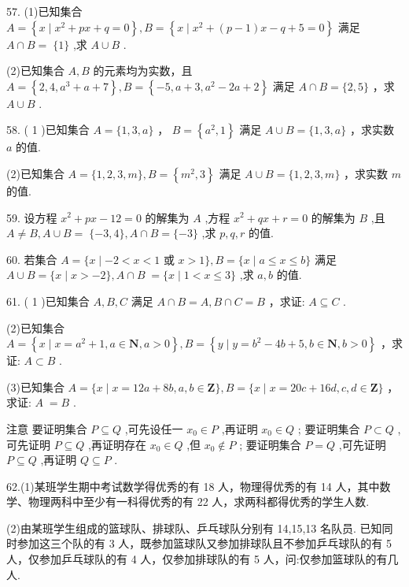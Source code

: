 \documentclass[10pt]{article}
\begin{document}
57. (1)已知集合 \(A = \left\{  {x \mid  {x}^{2} + {px} + q = 0}\right\}  ,B = \left\{  {x \mid  {x}^{2} + \left( {p - 1}\right) x - q + 5 = 0}\right\}\) 满足 \(A \cap  B = \; \{ 1\}\) ,求 \(A \cup  B\) .

(2)已知集合 \(A,B\) 的元素均为实数，且 \(A = \left\{  {2,4,{a}^{3} + a + 7}\right\}  ,B = \left\{  {-5,a + 3,{a}^{2} - {2a} + 2}\right\}\) 满足 \(A \cap  B = \{ 2,5\}\) ，求 \(A \cup  B\) .

58. ( 1 )已知集合 \(A = \{ 1,3,a\}\) ， \(B = \left\{  {{a}^{2},1}\right\}\) 满足 \(A \cup  B = \{ 1,3,a\}\) ，求实数 \(a\) 的值.

(2)已知集合 \(A = \{ 1,2,3,m\} ,B = \left\{  {{m}^{2},3}\right\}\) 满足 \(A \cup  B = \{ 1,2,3,m\}\) ，求实数 \(m\) 的值.

59. 设方程 \({x}^{2} + {px} - {12} = 0\) 的解集为 \(A\) ,方程 \({x}^{2} + {qx} + r = 0\) 的解集为 \(B\) ,且 \(A \neq  B,A \cup  B = \; \{  - 3,4\} ,A \cap  B = \{  - 3\}\) ,求 \(p,q,r\) 的值.

60. 若集合 \(A = \{ x \mid   - 2 < x < 1\) 或 \(x > 1\} ,B = \{ x \mid  a \leq  x \leq  b\}\) 满足 \(A \cup  B = \{ x \mid  x >  - 2\} ,A \cap  B \; = \{ x \mid  1 < x \leq  3\}\) ,求 \(a,b\) 的值.

61. ( 1 )已知集合 \(A,B,C\) 满足 \(A \cap  B = A,B \cap  C = B\) ，求证: \(A \subseteq  C\) .

(2)已知集合 \(A = \left\{  {x \mid  x = {a}^{2} + 1,a \in  \mathbf{N},a > 0}\right\}  ,B = \left\{  {y \mid  y = {b}^{2} - {4b} + 5,b \in  \mathbf{N},b > 0}\right\}\) ，求证: \(A \subset  B\) .

(3)已知集合 \(A = \{ x \mid  x = {12a} + {8b},a,b \in  \mathbf{Z}\} ,B = \{ x \mid  x = {20c} + {16d},c,d \in  \mathbf{Z}\}\) ，求证: \(A \; = B\) .

注意 要证明集合 \(P \subseteq  Q\) ,可先设任一 \({x}_{0} \in  P\) ,再证明 \({x}_{0} \in  Q\) ; 要证明集合 \(P \subset  Q\) ,可先证明 \(P \subseteq  Q\) ,再证明存在 \({x}_{0} \in  Q\) ,但 \({x}_{0} \notin  P\) ; 要证明集合 \(P = Q\) ,可先证明 \(P \subseteq  Q\) ,再证明 \(Q \subseteq  P\) .

62.(1)某班学生期中考试数学得优秀的有 18 人，物理得优秀的有 14 人，其中数学、物理两科中至少有一科得优秀的有 22 人，求两科都得优秀的学生人数.

(2)由某班学生组成的篮球队、排球队、乒乓球队分别有 14,15,13 名队员. 已知同时参加这三个队的有 3 人，既参加篮球队又参加排球队且不参加乒乓球队的有 5 人，仅参加乒乓球队的有 4 人，仅参加排球队的有 5 人，问:仅参加篮球队的有几人.
\end{document}
